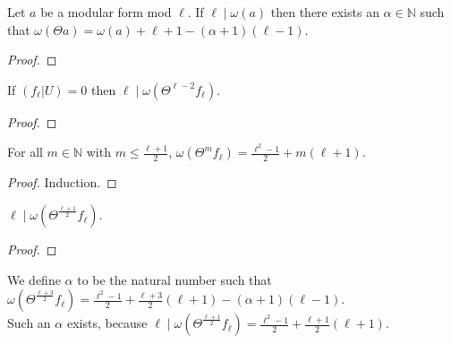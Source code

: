 \begin{lemma}
  \label{lem:Filt_Theta_congruence_of_div} 
  \leanok
  Let $a$ be a modular form mod $\ell$. If $\ell \mid \omega (a)$ then
  there exists an $\alpha \in \mathbb{N}$ such that 
  $\omega (\Theta a) = \omega (a) + \ell + 1 - (\alpha + 1) (\ell - 1)$.
\end{lemma}
\begin{proof}
  \leanok
\end{proof}


\begin{theorem}
  \label{thm:Filt_Theta_l_sub_two}
  \leanok
  If $(f_\ell | U) = 0$ then $\ell \mid \omega (\Theta^{\ell - 2} f_\ell)$.
\end{theorem}
\begin{proof}
  \leanok
\end{proof}


\begin{lemma}
  \label{lem:Filt_Theta_lel_add_one_div_two}
  \leanok
  For all $m \in \mathbb{N}$ with $m \le \frac{\ell + 1}{2}$,
  $\omega (\Theta^m f_\ell) = \frac{\ell^2 - 1}{2} + m (\ell + 1)$.
\end{lemma}
\begin{proof}
  \leanok
  Induction.
\end{proof}


\begin{theorem}
  \label{thm:Filt_Theta_l_add_one_div_two}
  \leanok
  $\ell \mid \omega (\Theta^{\frac{\ell + 1}{2}} f_\ell)$.
\end{theorem}
\begin{proof}
  \leanok
\end{proof}


\begin{definition}
  \label{def:alpha}
  \leanok
  We define $\alpha$ to be the natural number such that 
  $\omega (\Theta^{\frac{\ell + 3}{2}} f_\ell) = \frac{\ell^2 - 1}{2} + \frac{\ell + 3}{2} (\ell + 1) - (\alpha + 1) (\ell - 1)$. \\
  Such an $\alpha$ exists, because 
  $\ell \mid \omega (\Theta^{\frac{\ell + 1}{2}} f_\ell) = \frac{\ell^2 - 1}{2} + \frac{\ell + 1}{2} (\ell + 1)$.
\end{definition}

